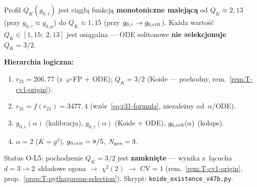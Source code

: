 \begin{remark}[Hierarchia predykcji i~status $Q_K = 3/2$ (v47b)]%
\label{rem:T-prediction-hierarchy}
Profil $Q_K(g_{0,\tau})$ jest ci\k{a}g\l{}\k{a} funkcj\k{a}
\textbf{monotoniczne malej\k{a}c\k{a}} od $Q_K \approx 2{,}13$
(przy $g_{0,\tau} \approx g_{0,\mu}$) do $Q_K \approx 1{,}15$
(przy $g_{0,\tau} \to g_{0,\rm crit}$).
Ka\.zda warto\'s\'c $Q_K \in [1{,}15;\; 2{,}13]$ jest osi\k{a}galna
--- ODE solitonowe \textbf{nie selekcjonuje} $Q_K = 3/2$.

\medskip\noindent
\textbf{Hierarchia logiczna:}
\begin{enumerate}[nosep]
  \item[\textsc{wej.}]
    $r_{21} = 206{,}77$ (z~$\varphi$-FP + ODE);
    $Q_K = 3/2$ (Koide --- pochodny,
    rem.~\ref{rem:T-cv1-origin}).
  \item[\textsc{alg.}]
    $r_{31} = f(r_{21}) = 3477{,}4$ (wzór~\eqref{eq:r31-formula},
    niezale\.zny od~$\alpha$/ODE).
  \item[\textsc{ode.}]
    $g_{0,e}(\alpha)$ (kalibracja), $g_{0,\tau}(\alpha)$ (Koide + ODE),
    $g_{0,\rm crit}(\alpha)$ (kolaps).
  \item[\textsc{lag.}]
    $\alpha = 2$ ($K = g^4$), $g_{0,\rm crit} = 8/5$, $N_{\rm gen} = 3$.
\end{enumerate}
Status O-L5: pochodzenie $Q_K = 3/2$ jest \textbf{zamkni\k{e}te}
--- wynika z~\l{}\k{a}cucha $d{=}3 \to 2$~sk\l{}adowe ogona
$\to$ $\chi^2(2)$ $\to$ $\mathrm{CV}{=}1$
(rem.~\ref{rem:T-cv1-origin},
prop.~\ref{prop:T-pythagorean-selection}).
Skrypt: \texttt{koide\_existence\_v47b.py}.
\end{remark}

